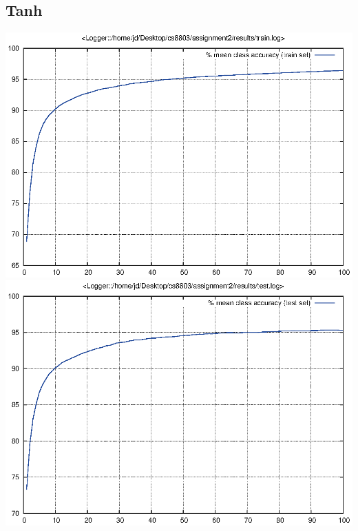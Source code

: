 \documentclass[twoside,12pt]{article}
\newcommand{\imsize}{0.5\linewidth}
\begin{document}
\subsection{Tanh}
\includegraphics[width=\imsize]{assignment2/results/tanh_train}
\includegraphics[width=\imsize]{assignment2/results/tanh_test}
\end{document}
